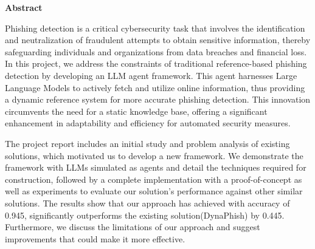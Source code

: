 \thispagestyle{plain}
\begin{center}
    \Large
    \textbf{Abstract}
\end{center}




Phishing detection is a critical cybersecurity task that involves the identification and neutralization of fraudulent attempts to obtain sensitive information, thereby safeguarding individuals and organizations from data breaches and financial loss. In this project, we address the constraints of traditional reference-based phishing detection by developing an LLM agent framework. This agent harnesses Large Language Models to actively fetch and utilize online information, thus providing a dynamic reference system for more accurate phishing detection. This innovation circumvents the need for a static knowledge base, offering a significant enhancement in adaptability and efficiency for automated security measures.

The project report includes an initial study and problem analysis of existing solutions, which motivated us to develop a new framework. We demonstrate the framework with LLMs simulated as agents and detail the techniques required for construction, followed by a complete implementation with a proof-of-concept as well as experiments to evaluate our solution's performance against other similar solutions. The results show that our approach has achieved with accuracy of 0.945, significantly outperforms the existing solution(DynaPhish) by 0.445. Furthermore, we discuss the limitations of our approach and suggest improvements that could make it more effective.

